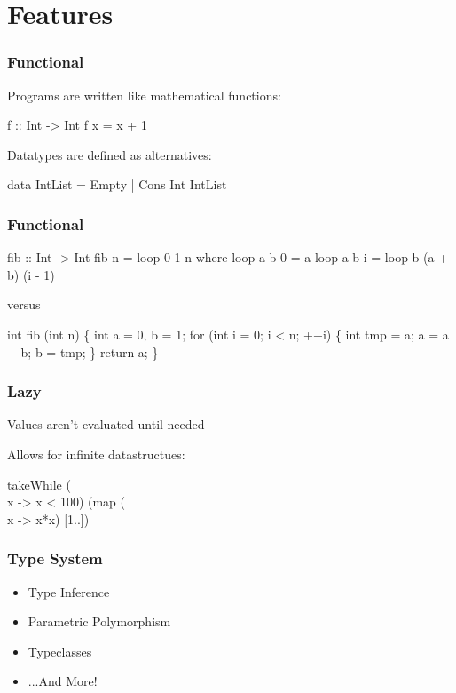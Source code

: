 \section{Features}

\frame{\sectionpage}

\begin{frame}[fragile]
  \frametitle{Functional}

  Programs are written like mathematical functions:

  \begin{semiverbatim}
f :: Int -> Int
f x = x + 1
  \end{semiverbatim}

  Datatypes are defined as alternatives:

  \begin{semiverbatim}
data IntList = Empty | Cons Int IntList
  \end{semiverbatim}
\end{frame}  

\begin{frame}[fragile]
  \frametitle{Functional}

  \begin{semiverbatim}
fib :: Int -> Int
fib n = loop 0 1 n
  where loop a b 0 = a
        loop a b i = loop b (a + b) (i - 1)
  \end{semiverbatim}

  versus
  
  \begin{semiverbatim}
int fib (int n) \{
    int a = 0, b = 1;
    for (int i = 0; i < n; ++i) \{
        int tmp = a;
        a = a + b;
        b = tmp;
    \}
    return a;
\}
  \end{semiverbatim}
\end{frame}

\begin{frame}[fragile]
  \frametitle{Lazy}

  Values aren't evaluated until needed

  Allows for infinite datastructues:

  \begin{semiverbatim}
takeWhile (\\x -> x < 100)
          (map (\\x -> x*x) [1..])
  \end{semiverbatim}
\end{frame}

\begin{frame}
  \frametitle{Type System}

  \begin{itemize}
  \item Type Inference
  \item Parametric Polymorphism
  \item Typeclasses
  \item ...And More!
  \end{itemize}
\end{frame} 

